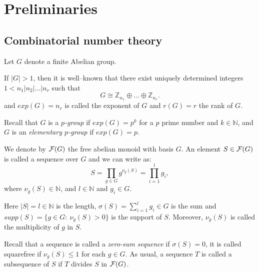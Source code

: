\documentclass[12pt]{article}
\newtheorem{cor}[thm]{Corollary}
\newcommand{\be}{\begin{equation}}
\newcommand{\ee}{\end{equation}}
\newcommand{\cF}{\mbox{$\cal F$}}
\newcommand{\N}{\mathbb N}
\newcommand{\Z}{\mathbb Z}
\begin{document}




\section{Preliminaries}

\subsection{Combinatorial number theory}

Let $G$ denote a finite Abelian group. 

If $|G|>1$, then it is well--known that there exist uniquely determined integers $1<n_1 | n_2 | \ldots | n_r$ such that 
$$
G \cong {\Z}_{n_1} \oplus \ldots \oplus {\Z}_{n_r}.
$$
and $exp(G)=n_r$ is called the exponent of $G$ and $r(G)=r$ the rank of $G$.

Recall that  $G$ is a {\em $p$-group} if $exp(G)=p^k$ for a $p$ prime number and $k\in \N$, and $G$ is an {\em elementary $p$-group} if $exp(G)=p$. 

We denote by $\cF(G)$ the free abelian monoid with basis $G$. An element $S\in \cF(G)$ is called a sequence over  $G$ and we can write as:
$$
S=\prod_{g\in G} g^{\nu_g(S)}= \prod_{i=1}^l g_i,
$$  
where $\nu_g(S)\in \N$, and $l\in \N$ and $g_i\in G$. 

Here $|S|=l\in \N$ is the length, $\sigma(S)=\sum_{i=1}^l g_i\in G$ is the sum and $supp(S)=\{g\in G:~ \nu_g(S)>0\}$ is the support of $S$.  Moreover,  $\nu_g(S)$ is called the multiplicity of $g$ in $S$. 

Recall that a sequence is called a {\em zero-sum sequence} if $\sigma(S)=0$, it is called squarefree if $\nu_g(S)\leq 1$ for each $g\in G$. As usual, a sequence $T$ is called a subsequence  of $S$ if $T$ divides $S$ in $\cF(G)$. 
\end{document}

